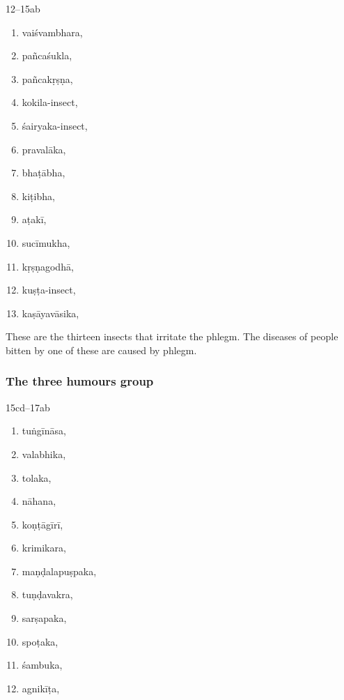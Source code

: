 \begin{translation}
\item[12--15ab]

\begin{multicols}{2}
    \begin{enumerate}
        \item \Gls{vaiśvambhara},
        \item \Gls{pañcaśukla},
        \item \Gls{pañcakṛṣṇa},
        \item \Gls{kokila-insect},
        \item \Gls{śairyaka-insect},
        \item \Gls{pravalāka},
        \item \Gls{bhaṭābha},
        \item \Gls{kiṭibha},
        \item \Gls{aṭakī},
        \item \Gls{sucīmukha},
        \item \Gls{kṛṣṇagodhā},
        \item \Gls{kuṣṭa-insect},
        \item \Gls{kaṣāyavāsika},
        \end{enumerate}
\end{multicols}

These are the thirteen  insects that irritate the phlegm.
The diseases of people bitten by one of these are caused by phlegm.

\subsubsection{The three humours group}

\item[15cd--17ab]
\begin{multicols}{2}
    \begin{enumerate}
        \item \Gls{tuṅgīnāsa},
        \item \Gls{valabhika},
        \item \Gls{tolaka},
        \item \Gls{nāhana},
        \item \Gls{koṇṭāgīrī},
        \item \Gls{krimikara},
        \item \Gls{maṇḍalapuṣpaka},
        \item \Gls{tuṇḍavakra},
        \item \Gls{sarṣapaka},
        \item \Gls{spoṭaka},
        \item \Gls{śambuka},
        \item \Gls{agnikīṭa},
       \end{enumerate}
\end{multicols}


\end{translation}
